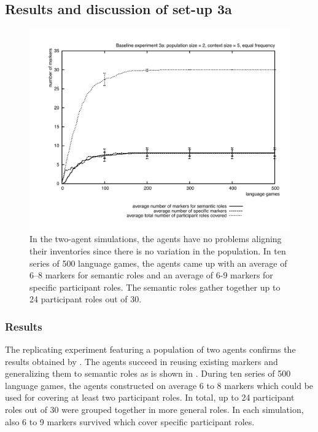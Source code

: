 \subsection{Results and discussion of set-up 3a}

\begin{figure}[ht]
\centerline{\includegraphics[width=\textwidth]{Chapter3/figs/graph-base3-size3a}}
  \caption[Baseline experiment 3a: number of markers]{In the two-agent simulations, the agents have no problems aligning their inventories since there is no variation in the population. In ten series of 500 language games, the agents came up with an average of 6--8 markers for semantic roles and an average of 6-9 markers for specific participant roles. The semantic roles gather together up to 24 participant roles out of 30.}
   \label{f:base3-size3a}
\end{figure}

\subsubsection{Results}
 The replicating experiment featuring a population of two agents confirms the results obtained by \citet{steels02simulating, steels04constructivist}. The agents succeed in reusing existing markers and generalizing them to semantic roles as is shown in  . During ten series of 500 language games, the agents constructed on average 6 to 8 markers which could be used for covering at least two participant roles. In total, up to 24 participant roles out of 30 were grouped together in more general roles. In each simulation, also 6 to 9 markers survived which cover specific participant roles.

